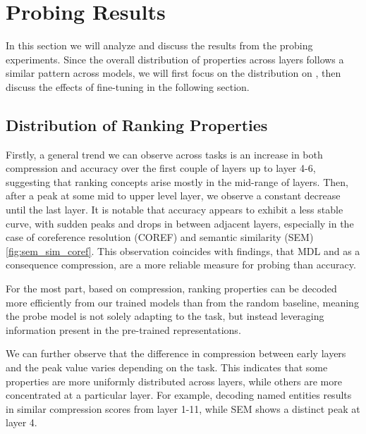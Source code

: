 \chapter{Probing Results}
\label{chap:results}
In this section we will analyze and discuss the results from the probing experiments. Since the overall distribution of properties across layers follows a similar pattern across models, we will first focus on the distribution on , then discuss the effects of fine-tuning in the following section.

\section{Distribution of Ranking Properties}
Firstly, a general trend we can observe across tasks is an increase in both compression and accuracy over the first couple of layers up to layer 4-6, suggesting that ranking concepts arise mostly in the mid-range of layers. Then, after a peak at some mid to upper level layer, we observe a constant decrease until the last layer. It is notable that accuracy appears to exhibit a less stable curve, with sudden peaks and drops in between adjacent layers, especially in the case of coreference resolution (COREF) and semantic similarity (SEM) \autoref{fig:sem_sim_coref}. This observation coincides with \cite{voita-titov-2020-information} findings, that MDL and as a consequence compression, are a more reliable measure for probing than accuracy.

For the most part, based on compression, ranking properties can be decoded more efficiently from our trained models than from the random baseline, meaning the probe model is not solely adapting to the task, but instead leveraging information present in the pre-trained representations.

We can further observe that the difference in compression between early layers and the peak value varies depending on the task. This indicates that some properties are more uniformly distributed across layers, while others are more concentrated at a particular layer. For example, decoding named entities results in similar compression scores from layer 1-11, while SEM shows a distinct peak at layer 4.

